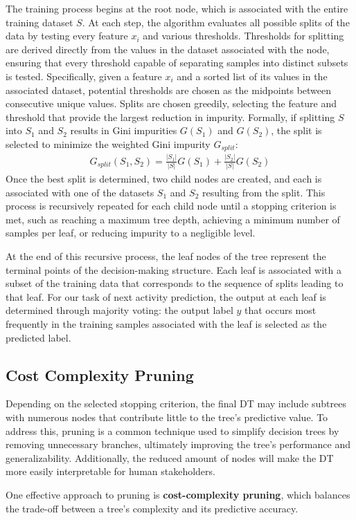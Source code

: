 The training process begins at the root node,
which is associated with the entire training dataset $S$.
At each step, the algorithm evaluates all possible splits of the data by testing every feature $x_i$
and various thresholds.
Thresholds for splitting are derived directly from the values in the dataset associated with the node,
ensuring that every threshold capable of separating samples into distinct subsets is tested.
Specifically, given a feature $x_i$ and a sorted list of its values in the associated dataset,
potential thresholds are chosen as the midpoints between consecutive unique values.
Splits are chosen greedily, selecting the feature and threshold that provide the largest reduction in impurity.
Formally, if splitting $S$ into $S_1$ and $S_2$ results in Gini impurities $G(S_1)$ and $G(S_2)$,
the split is selected to minimize the weighted Gini impurity $G_{split}$:
\begin{align}
  G_{split}(S_1, S_2) = \frac{|S_1|}{|S|}G(S_1) + \frac{|S_2|}{|S|}G(S_2)
\end{align}
Once the best split is determined, two child nodes are created,
and each is associated with one of the datasets $S_1$ and $S_2$ resulting from the split.
This process is recursively repeated for each child node until a stopping criterion is met,
such as reaching a maximum tree depth, achieving a minimum number of samples per leaf,
or reducing impurity to a negligible level.

At the end of this recursive process,
the leaf nodes of the tree represent the terminal points of the decision-making structure.
Each leaf is associated with a subset of the training data
that corresponds to the sequence of splits leading to that leaf.
For our task of next activity prediction,
the output at each leaf is determined through majority voting:
the output label $y$ that occurs most frequently in the training samples
associated with the leaf is selected as the predicted label.

\subsection{Cost Complexity Pruning}
Depending on the selected stopping criterion,
the final DT may include subtrees with numerous nodes
that contribute little to the tree's predictive value.
To address this, pruning is a common technique used to simplify decision trees
by removing unnecessary branches, ultimately improving the tree's performance and generalizability.
Additionally, the reduced amount of nodes 
will make the DT more easily interpretable for human stakeholders.

One effective approach to pruning is \textbf{cost-complexity pruning},
which balances the trade-off between a tree's complexity and its predictive accuracy.
\cite{ccp}